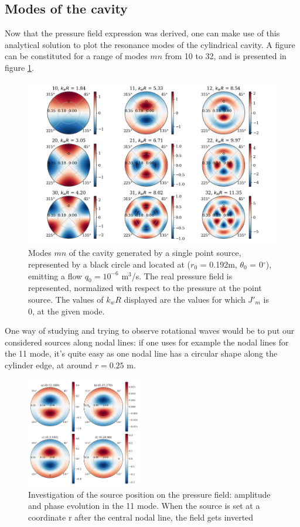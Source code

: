 \documentclass[%
 reprint,
 amsmath,amssymb,
 aip,
]{revtex4-1}
\begin{document}
\subsection{Modes of the cavity}
Now that the pressure field expression was derived, one can make use of this analytical solution to plot the resonance modes of the cylindrical cavity. A figure can be constituted for a range of modes $mn$ from 10 to 32, and is presented in figure \ref{fig:modes}.

\begin{figure}
    \centering
    \includegraphics[width=\textwidth]{figures/modes.png}
    \caption{Modes $mn$ of the cavity generated by a single point source, represented by a black circle and located at ($r_0$ = 0.192m, $\theta_0$ = 0$^\circ$), emitting a flow $q_0 = 10^{-6}$ m$^3$/s. The real pressure field is represented, normalized with respect to the pressure at the point source. The values of $k_w R$ displayed are the values for which $J'_m$ is 0, at the given mode.}
    \label{fig:modes}
\end{figure}

One way of studying and trying to observe rotational waves would be to put our considered sources along nodal lines: if one uses for example the nodal lines for the 11 mode, it's quite easy as one nodal line has a circular shape along the cylinder edge, at around $r = 0.25$ m.

\begin{figure}
    \centering
    \includegraphics[width=0.45\textwidth]{figures/source_pos.png}
    \caption{Investigation of the source position on the pressure field: amplitude and phase evolution in the 11 mode. When the source is set at a coordinate r after the central nodal line, the field gets inverted}
    \label{fig:source_pos}
\end{figure}
\end{document}
